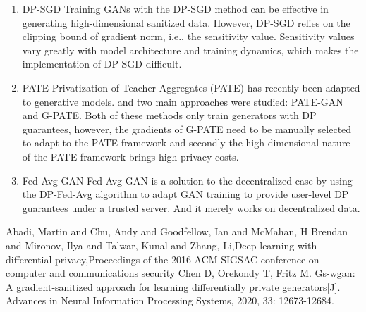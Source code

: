 \documentclass[
    ngerman,american
    ]{scrartcl}
\newcommand{\lang}{en}
\begin{document}
      
        \sectionSource{\lang}
        \sectionSourceDescription{\lang}
        \begin{enumerate}
            \item{DP-SGD}
            Training GANs with the DP-SGD method can be effective in generating high-dimensional sanitized data. However, DP-SGD relies on the clipping bound of gradient norm, i.e., the sensitivity value. Sensitivity values vary greatly with model architecture and training dynamics, which makes the implementation of DP-SGD difficult.
            \item{PATE} 
            Privatization of Teacher Aggregates (PATE) has recently been adapted to generative models. and two main approaches were studied: PATE-GAN and G-PATE. Both of these methods only train generators with DP guarantees, however, the gradients of G-PATE need to be manually selected to adapt to the PATE framework and secondly the high-dimensional nature of the PATE framework brings high privacy costs.
            \item{Fed-Avg GAN}
             Fed-Avg GAN is a solution to the decentralized case by using the DP-Fed-Avg algorithm to adapt GAN training to provide user-level DP guarantees under a trusted server. And it merely works on decentralized data.
        \end{enumerate}
        \begin{thebibliography}{99}
             Abadi, Martin and Chu, Andy and Goodfellow, Ian and McMahan, H Brendan and Mironov, Ilya and Talwar, Kunal and Zhang, Li,Deep learning with differential privacy,Proceedings of the 2016 ACM SIGSAC conference on computer and communications security
             Chen D, Orekondy T, Fritz M. Gs-wgan: A gradient-sanitized approach for learning differentially private generators[J]. Advances in Neural Information Processing Systems, 2020, 33: 12673-12684.

        \end{thebibliography}
\end{document}
